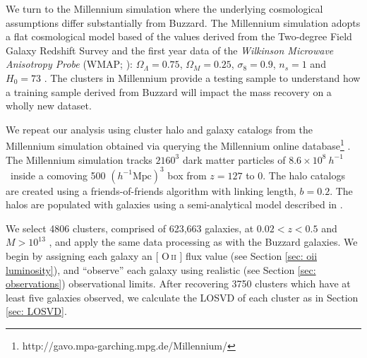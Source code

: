 \documentclass[fleqn,usenatbib]{mnras}
\makeatletter
\DeclareRobustCommand{\ion}[2]{%
\relax\ifmmode
\ifx\testbx\f@series
{\mathbf{#1\,\mathsc{#2}}}\else
{\mathrm{#1\,\mathsc{#2}}}\fi
\else\textup{#1\,{\mdseries\textsc{#2}}}%
\fi}
\makeatother
\begin{document}
We turn to the Millennium simulation where the underlying cosmological assumptions differ substantially from Buzzard. The Millennium simulation adopts a flat cosmological model based of the values derived from the Two-degree Field Galaxy Redshift Survey \citep{Colless2001} and the first year data of the \emph{Wilkinson Microwave Anisotropy Probe} (WMAP; \citealt{Spergel2003}): $\Omega_\Lambda = 0.75$, $\Omega_M = 0.25$, $\sigma_8 = 0.9$, $n_s = 1$ and $H_0= 73$ \kms \mpc. The clusters in Millennium provide a testing sample to understand how a training sample derived from Buzzard will impact the mass recovery on a wholly new dataset. 

We repeat our analysis using cluster halo and galaxy catalogs from the Millennium simulation \citep{Springel2005a} obtained via querying the Millennium online database\footnote{http://gavo.mpa-garching.mpg.de/Millennium/} \citep{Lemson2006}. The Millennium simulation tracks $2160^3$ dark matter particles of $8.6\times 10^8 ~h^{-1}$ \Msol\ inside a comoving 500 $(h^{-1} \mathrm{Mpc})^3$ box from $z=127$ to 0. The halo catalogs are created using a friends-of-friends algorithm  with linking length, $b=0.2$. The halos are populated with galaxies using a semi-analytical model described in \cite{Croton2006, DeLucia2006, DeLucia2007a}. 

We select 4806 clusters, comprised of 623,663 galaxies, at $0.02 < z < 0.5$ and $M > 10^{13}$ \Msol, and apply the same data processing as with the Buzzard galaxies. We begin by assigning each galaxy an [\ion{O}{ii}] flux value (see Section \ref{sec: oii luminosity}), and ``observe'' each galaxy using realistic (see Section \ref{sec: observations}) observational limits. After recovering 3750 clusters which have at least five galaxies observed, we calculate the LOSVD of each cluster as in Section \ref{sec: LOSVD}. 
\end{document}

